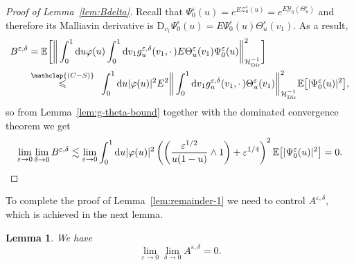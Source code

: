 \documentclass[10pt]{amsart}
\newtheorem{lemm}[theo]{Lemma}\newtheorem{prop}[theo]{Proposition}\newtheorem{coro}[theo]{Corollary}\newtheorem{conj}[theo]{Conjecture}
\theoremstyle{definition}\newtheorem{defi}[theo]{Definition}\newtheorem{rema}[theo]{Remark}\newtheorem{exam}[theo]{Example}\newtheorem{exem}[theo]{Example}\newtheorem{nota}[theo]{Notation}
\DeclareMathOperator{\Dir}{Dir}
\newcommand{\mc}[1]{{\mathcal #1}}
\renewcommand{\mc}[1]{{\mathcal #1}}
\renewcommand{\leq}{\leqslant}
\newcommand*{\dd}{\mathrm{d}}
\newcommand*{\du}{\dd u}
\newcommand*{\dv}{\dd v}
\begin{document}
\begin{proof}[Proof of Lemma~\ref{lem:Bdelta}]
Recall that $\Psi_0^\varepsilon(u)=e^{E\mc Z_0^\varepsilon(u)} = e^{E \mc Y_0(\Theta^\varepsilon_u)}$ and therefore its Malliavin derivative is $\mathrm{D}_{v_1} \Psi^{\varepsilon}_0 (u) = E \Psi^{\varepsilon}_0 (u) \Theta^{\varepsilon}_u (v_1)$. As a result,
\begin{align*}
B^{\varepsilon, \delta} &=\mathbb{E} \bigg[\bigg\| \int_0^1 \du
\varphi (u) \int_0^1 \dv_1 g^{\varepsilon, \delta}_u (v_1, \cdot\,) E \Theta^{\varepsilon}_u (v_1) \Psi^{\varepsilon}_0 (u)
\bigg\|_{\mc H_{\Dir}^{- 1}}^2 \bigg]\\
&\overset{\mathclap{(C-S)}}{\leq} \;\,\int_0^1 \du | \varphi (u) |^2 E^2 \bigg\| \int_0^1 \dv_1 g^{\varepsilon, \delta}_u (v_1, \cdot\,) \Theta^{\varepsilon}_u (v_1) \bigg\|_{\mc H_{\Dir}^{- 1}}^2 \mathbb{E} \big[| \Psi^{\varepsilon}_0 (u) |^2\big],
\end{align*}
so from Lemma~\ref{lem:g-theta-bound} together with the dominated convergence theorem we get
\[
\lim_{\varepsilon \rightarrow 0} \lim_{\delta \rightarrow 0} B^{\varepsilon, \delta} \lesssim \lim_{\varepsilon \rightarrow 0}
\int_0^1 \du | \varphi (u) |^2 \left(\left(\frac{\varepsilon^{1/2}}{u (1 - u)} \wedge 1 \right) + \varepsilon^{1/4} \right)^2
\mathbb{E} \big[| \Psi^{\varepsilon}_0 (u) |^2\big] = 0. \qedhere
\]
\end{proof}

To complete the proof of Lemma~\ref{lem:remainder-1} we need to control $A^{\varepsilon, \delta}$, which is achieved in the next lemma.

\begin{lemm}\label{lem:Adelta}
We have
\[
\lim_{\varepsilon \rightarrow 0} \lim_{\delta \rightarrow 0} A^{\varepsilon, \delta} = 0.
\]
\end{lemm}
\end{document}
